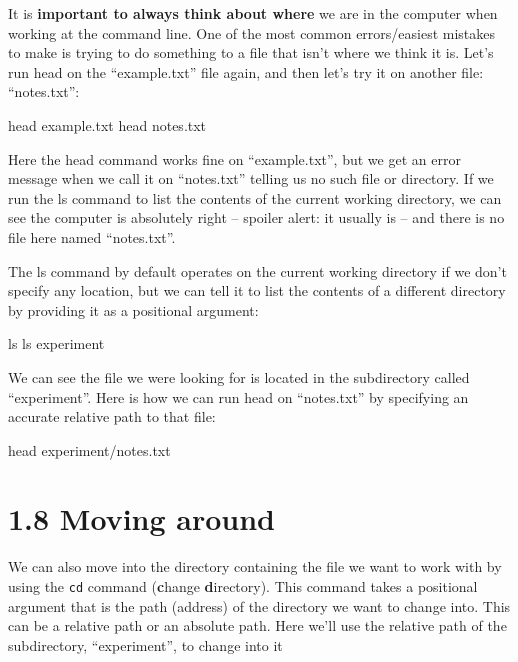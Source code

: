 \documentclass[
]{book}
\newenvironment{Shaded}{\begin{snugshade}}{\end{snugshade}}
\newcommand{\FunctionTok}[1]{\textcolor[rgb]{0.00,0.00,0.00}{#1}}
\newcommand{\NormalTok}[1]{#1}
\begin{document}
It is \textbf{important to always think about where} we are in the computer when working at the command line. One of the most common errors/easiest mistakes to make is trying to do something to a file that isn't where we think it is. Let's run head on the ``example.txt'' file again, and then let's try it on another file: ``notes.txt'':

\begin{Shaded}
\begin{Highlighting}[]
\FunctionTok{head}\NormalTok{ example.txt}
\FunctionTok{head}\NormalTok{ notes.txt}
\end{Highlighting}
\end{Shaded}

Here the head command works fine on ``example.txt'', but we get an error message when we call it on ``notes.txt'' telling us no such file or directory. If we run the ls command to list the contents of the current working directory, we can see the computer is absolutely right -- spoiler alert: it usually is -- and there is no file here named ``notes.txt''.

The ls command by default operates on the current working directory if we don't specify any location, but we can tell it to list the contents of a different directory by providing it as a positional argument:

\begin{Shaded}
\begin{Highlighting}[]
    \FunctionTok{ls}
    \FunctionTok{ls}\NormalTok{ experiment}
\end{Highlighting}
\end{Shaded}

We can see the file we were looking for is located in the subdirectory called ``experiment''. Here is how we can run head on ``notes.txt'' by specifying an accurate relative path to that file:

\begin{Shaded}
\begin{Highlighting}[]
    \FunctionTok{head}\NormalTok{ experiment/notes.txt}
\end{Highlighting}
\end{Shaded}

\hypertarget{moving-around}{%
\section{1.8 Moving around}\label{moving-around}}

We can also move into the directory containing the file we want to work with by using the \texttt{cd} command (\textbf{c}hange \textbf{d}irectory). This command takes a positional argument that is the path (address) of the directory we want to change into. This can be a relative path or an absolute path. Here we'll use the relative path of the subdirectory, ``experiment'', to change into it
\end{document}

